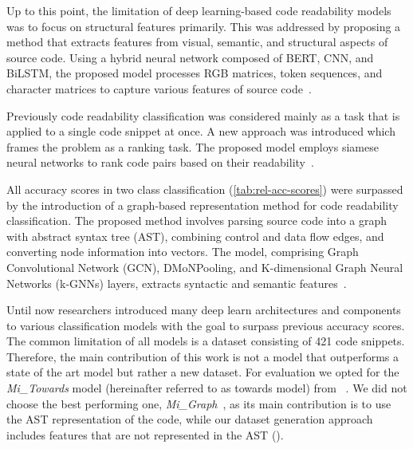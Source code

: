 \documentclass[%
class=scrreprt,
chapterprefix=false,%
open=right,%
twoside=false,%
paper=a4,%
logofile={Logo\_zentral\_farbig\_EN.png},%
thesistype=master,%
UKenglish,%
]{se2thesis}
\theoremstyle{definition}
\newcommand{\numMerged}{421\xspace}
\begin{document}
	Up to this point, the limitation of deep learning-based code readability models was to focus on structural features primarily. This was addressed by proposing a method that extracts features from visual, semantic, and structural aspects of source code. Using a hybrid neural network composed of BERT, CNN, and BiLSTM, the proposed model processes RGB matrices, token sequences, and character matrices to capture various features of source code~\cite{mi2022towards}.
	
	Previously code readability classification was considered mainly as a task that is applied to a single code snippet at once. A new approach was introduced which frames the problem as a ranking task. The proposed model employs siamese neural networks to rank code pairs based on their readability~\cite{mi2022rank}.

	All accuracy scores in two class classification (\autoref{tab:rel-acc-scores}) were surpassed by the introduction of a graph-based representation method for code readability classification. The proposed method involves parsing source code into a graph with abstract syntax tree (AST), combining control and data flow edges, and converting node information into vectors. The model, comprising Graph Convolutional Network (GCN), DMoNPooling, and K-dimensional Graph Neural Networks (k-GNNs) layers, extracts syntactic and semantic features~\cite{mi2023graph}.
	

	
	Until now researchers introduced many deep learn architectures and components to various classification models with the goal to surpass previous accuracy scores. The common limitation of all models is a dataset consisting of \numMerged code snippets. %
	Therefore, the main contribution of this work is not a model that outperforms a state of the art model but rather a new dataset. For evaluation we opted for the \textit{Mi\_Towards} model (hereinafter referred to as towards model) from \citeauthor{mi2022towards}~\cite{mi2022towards}. We did not choose the best performing one, \textit{Mi\_Graph}~\cite{mi2023graph}, as its main contribution is to use the AST representation of the code, while our dataset generation approach includes features that are not represented in the AST ().
			
\end{document}
